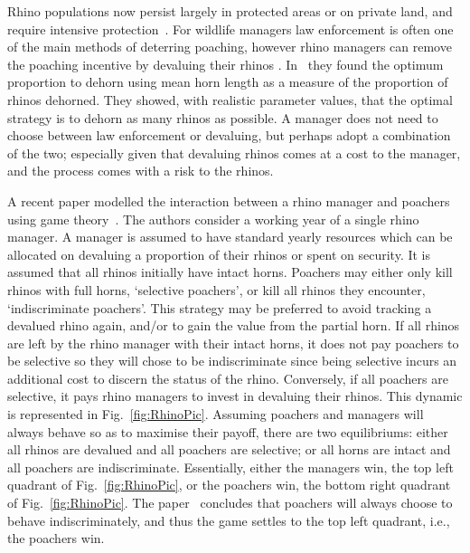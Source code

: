\documentclass[10pt]{article}
\begin{document}
Rhino populations now persist largely in protected areas or on private land, and
require intensive protection~\cite{Ferreira2014}. For wildlife managers law 
enforcement is often one of the main methods of deterring poaching, however 
rhino managers can remove the poaching incentive by devaluing their rhinos 
\cite{Milner1992}. In~\cite{Milner1992} they found the 
optimum proportion to dehorn using mean horn length as a measure of the 
proportion of rhinos dehorned. They showed, with realistic parameter values, 
that the optimal strategy is to dehorn as many rhinos as possible. 
A manager does not need to choose between law enforcement or devaluing, but
perhaps adopt a combination of the two; especially given that devaluing rhinos 
comes at a cost to the manager, and the process comes with a risk to the rhinos.

A recent paper modelled the interaction between a rhino manager and poachers
using game theory~\cite{Lee}.  The authors consider a working year of a single 
rhino manager.  A manager is assumed to have standard yearly resources which
can be allocated on devaluing a proportion of their rhinos or spent on security. 
It is assumed that all rhinos initially have intact horns. Poachers may either only
kill rhinos with full horns, `selective poachers', or kill all rhinos they encounter, 
`indiscriminate poachers'. This strategy may be preferred to avoid tracking a devalued rhino again, and/or to gain the value from the partial horn. If all rhinos are left by the rhino manager with their 
intact horns, it does not pay poachers to be selective so they will chose to be 
indiscriminate since being selective incurs an additional cost to discern the status of the rhino. Conversely, if all poachers are selective, it pays rhino managers 
to invest in devaluing their rhinos. This dynamic is represented in Fig.~\ref{fig:RhinoPic}.
Assuming poachers and managers will always behave so as to maximise their 
payoff, there are two equilibriums: either all rhinos are devalued and all poachers are selective;
or all horns are intact and all poachers are indiscriminate. Essentially, either the managers 
win, the top left quadrant of Fig.~\ref{fig:RhinoPic}, or the poachers win, the bottom
right quadrant of Fig.~\ref{fig:RhinoPic}. The paper~\cite{Lee} concludes that poachers will
always choose to behave indiscriminately, and thus the game settles to the top
left quadrant, i.e., the poachers win.
\end{document}
